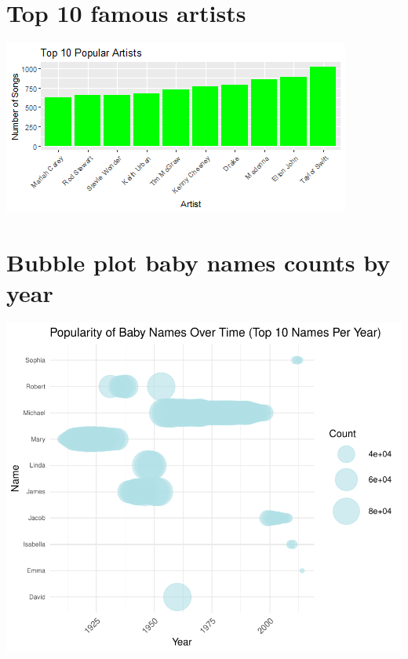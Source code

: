 \documentclass[11pt,preprint]{elsarticle}
\let\origfigure\figure
\let\endorigfigure\endfigure
\renewenvironment{figure}[1][2] {
    \expandafter\origfigure\expandafter[H]
} {
    \endorigfigure
}
\numberwithin{equation}{section}
\numberwithin{figure}{section}
\numberwithin{table}{section}
\begin{document}
\section{Top 10 famous artists}\label{top-10-famous-artists}

\begin{figure}[H]

{\centering \includegraphics{23034103_Q1USbabynames_files/figure-latex/Figure 5a-1} 

}

\caption{Caption Here \label{Figure1}}\label{fig:Figure 5a}
\end{figure}

\section{Bubble plot baby names counts by
year}\label{bubble-plot-baby-names-counts-by-year}

\includegraphics{23034103_Q1USbabynames_files/figure-latex/unnamed-chunk-3-1.pdf}
\end{document}
